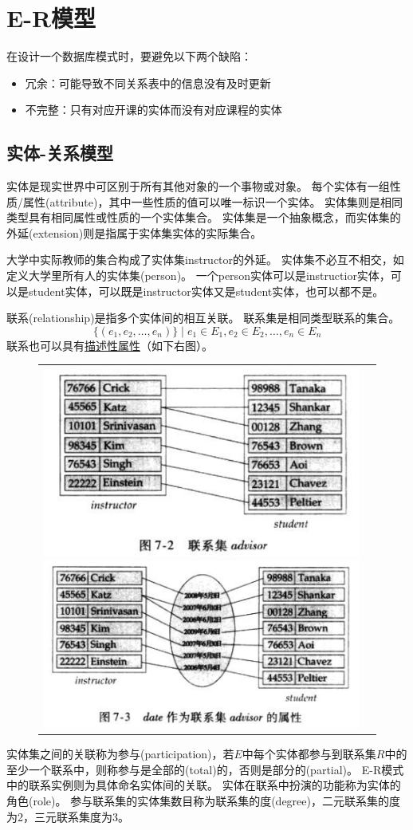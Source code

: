 
\section{E-R模型} %
在设计一个数据库模式时，要避免以下两个缺陷：
\begin{itemize}
	\item 冗余：可能导致不同关系表中的信息没有及时更新
	\item 不完整：只有对应开课的实体而没有对应课程的实体
\end{itemize}

\subsection{实体-关系模型}
\begin{definition}[实体]
实体是现实世界中可区别于所有其他对象的一个事物或对象。
每个实体有一组性质/属性(attribute)，其中一些性质的值可以唯一标识一个实体。
实体集则是相同类型具有相同属性或性质的一个实体集合。
实体集是一个抽象概念，而实体集的外延(extension)则是指属于实体集实体的实际集合。
\end{definition}

大学中实际教师的集合构成了实体集instructor的外延。
实体集不必互不相交，如定义大学里所有人的实体集(person)。
一个person实体可以是instructior实体，可以是student实体，可以既是instructor实体又是student实体，也可以都不是。

\begin{definition}[联系]
联系(relationship)是指多个实体间的相互关联。
联系集是相同类型联系的集合。
\[\{(e_1,e_2,\ldots,e_n)\}\mid e_1\in E_1, e_2\in E_2, \ldots, e_n\in E_n\]
联系也可以具有\underline{描述性属性}（如下右图）。
\begin{figure}[H]
\centering
\begin{tabular}{cc}
\includegraphics[width=0.5\linewidth]{fig/relationship_set.png}
\includegraphics[width=0.5\linewidth]{fig/relationship_set(description).png}
\end{tabular}
\end{figure}
实体集之间的关联称为参与(participation)，若$E$中每个实体都参与到联系集$R$中的至少一个联系中，则称参与是全部的(total)的，否则是部分的(partial)。
E-R模式中的联系实例则为具体命名实体间的关联。
实体在联系中扮演的功能称为实体的角色(role)。
参与联系集的实体集数目称为联系集的度(degree)，二元联系集的度为2，三元联系集度为3。
\end{definition}

